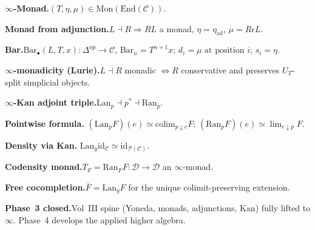 \begin{formalrestatement}
\textbf{$\infty$-Monad.}\quad $(T, \eta, \mu) \in \mathrm{Mon}(\mathrm{End}(\mathcal{C}))$.

\medskip
\textbf{Monad from adjunction.}\quad $L \dashv R \Rightarrow RL$ a monad,
$\eta = \eta_{\mathrm{ad}}$, $\mu = R\epsilon L$.

\medskip
\textbf{Bar.}\quad $\mathrm{Bar}_\bullet(L, T, x) : \Delta^{\mathrm{op}} \to \mathcal{C}$,
$\mathrm{Bar}_n = T^{n+1} x$; $d_i = \mu \text{ at position } i$; $s_i = \eta$.

\medskip
\textbf{$\infty$-monadicity (Lurie).}\quad $L \dashv R$ monadic
$\iff R$ conservative and preserves $U_T$-split simplicial objects.

\medskip
\textbf{$\infty$-Kan adjoint triple.}\quad $\mathrm{Lan}_p \dashv p^* \dashv \mathrm{Ran}_p$.

\medskip
\textbf{Pointwise formula.}\quad
$(\mathrm{Lan}_p F)(e) \simeq \mathrm{colim}_{p \downarrow e} F$;
$(\mathrm{Ran}_p F)(e) \simeq \lim_{e \downarrow p} F$.

\medskip
\textbf{Density via Kan.}\quad
$\mathrm{Lan}_y \mathrm{id}_\mathcal{C} \simeq \mathrm{id}_{\mathcal{P}(\mathcal{C})}$.

\medskip
\textbf{Codensity monad.}\quad $T_F = \mathrm{Ran}_F F : \mathcal{D} \to \mathcal{D}$
an $\infty$-monad.

\medskip
\textbf{Free cocompletion.}\quad $\bar F = \mathrm{Lan}_y F$ for the
unique colimit-preserving extension.

\medskip
\textbf{Phase~3 closed.}\quad Vol~III spine (Yoneda, monads, adjunctions,
Kan) fully lifted to $\infty$. Phase~4 develops the applied higher
algebra.
\end{formalrestatement}
